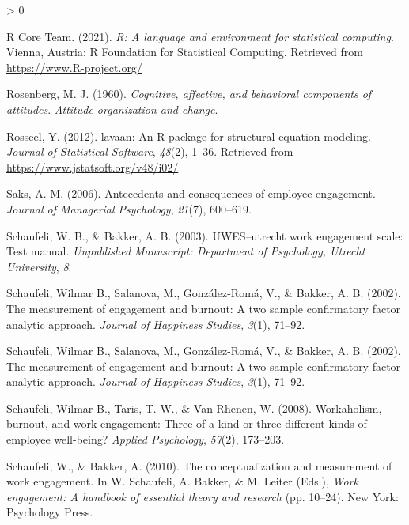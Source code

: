 \documentclass[
  english,
  man]{apa6}
\newlength{\cslhangindent}
\newenvironment{CSLReferences}[2] %
 {%
  \setlength{\parindent}{0pt}
  \ifodd #1 \everypar{\setlength{\hangindent}{\cslhangindent}}\ignorespaces\fi
  \ifnum #2 > 0
  \setlength{\parskip}{#2\baselineskip}
  \fi
 }%
 {}
\begin{document}
\begin{CSLReferences}{1}{0}
\leavevmode\hypertarget{ref-R-base}{}%
R Core Team. (2021). \emph{R: A language and environment for statistical computing}. Vienna, Austria: R Foundation for Statistical Computing. Retrieved from \url{https://www.R-project.org/}

\leavevmode\hypertarget{ref-rosenberg_cognitive_1960}{}%
Rosenberg, M. J. (1960). \emph{Cognitive, affective, and behavioral components of attitudes}. \emph{Attitude organization and change}.

\leavevmode\hypertarget{ref-R-lavaan}{}%
Rosseel, Y. (2012). {lavaan}: An {R} package for structural equation modeling. \emph{Journal of Statistical Software}, \emph{48}(2), 1--36. Retrieved from \url{https://www.jstatsoft.org/v48/i02/}

\leavevmode\hypertarget{ref-saks2006antecedents}{}%
Saks, A. M. (2006). Antecedents and consequences of employee engagement. \emph{Journal of Managerial Psychology}, \emph{21}(7), 600--619.

\leavevmode\hypertarget{ref-schaufeli_uwesutrecht_2003}{}%
Schaufeli, W. B., \& Bakker, A. B. (2003). {UWES}--utrecht work engagement scale: Test manual. \emph{Unpublished Manuscript: Department of Psychology, Utrecht University}, \emph{8}.

\leavevmode\hypertarget{ref-schaufeli_measurement_2002}{}%
Schaufeli, Wilmar B., Salanova, M., González-Romá, V., \& Bakker, A. B. (2002). The measurement of engagement and burnout: A two sample confirmatory factor analytic approach. \emph{Journal of Happiness Studies}, \emph{3}(1), 71--92.

\leavevmode\hypertarget{ref-schaufeli_measurement_2002}{}%
Schaufeli, Wilmar B., Salanova, M., González-Romá, V., \& Bakker, A. B. (2002). The measurement of engagement and burnout: A two sample confirmatory factor analytic approach. \emph{Journal of Happiness Studies}, \emph{3}(1), 71--92.

\leavevmode\hypertarget{ref-schaufeli2008workaholism}{}%
Schaufeli, Wilmar B., Taris, T. W., \& Van Rhenen, W. (2008). Workaholism, burnout, and work engagement: Three of a kind or three different kinds of employee well-being? \emph{Applied Psychology}, \emph{57}(2), 173--203.

\leavevmode\hypertarget{ref-schaufeli_conceptualization_2010}{}%
Schaufeli, W., \& Bakker, A. (2010). The conceptualization and measurement of work engagement. In W. Schaufeli, A. Bakker, \& M. Leiter (Eds.), \emph{Work engagement: A handbook of essential theory and research} (pp. 10--24). New York: Psychology Press.


\end{CSLReferences}
\end{document}
